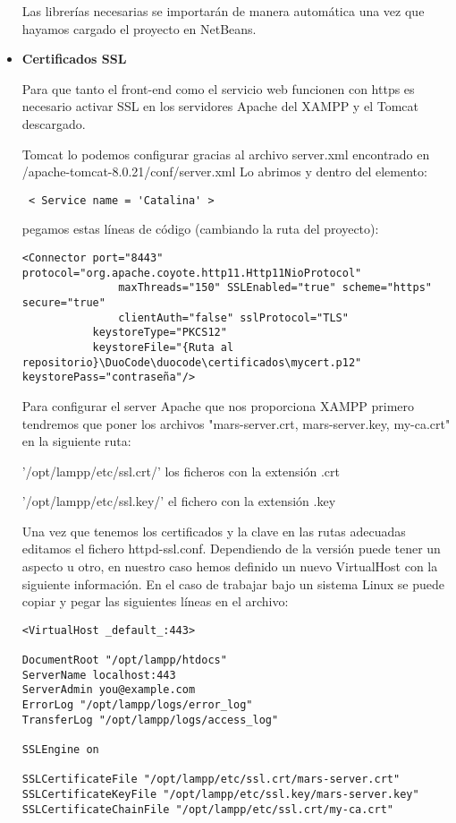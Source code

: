 \begin{itemize}
Las librerías necesarias se importarán de manera automática una vez que hayamos cargado el proyecto en NetBeans.

\item \textbf{Certificados SSL}

Para que tanto el front-end como el servicio web funcionen con https es necesario activar SSL en los servidores Apache del XAMPP y el Tomcat descargado.

Tomcat lo podemos configurar gracias al archivo server.xml encontrado en /apache-tomcat-8.0.21/conf/server.xml
Lo abrimos y dentro del elemento:
{\codesize
\begin{verbatim}
 < Service name = 'Catalina' >  
\end{verbatim}
}
pegamos estas líneas de código (cambiando la ruta del proyecto):

{\codesize
\begin{verbatim}
<Connector port="8443" protocol="org.apache.coyote.http11.Http11NioProtocol"
               maxThreads="150" SSLEnabled="true" scheme="https" secure="true"
               clientAuth="false" sslProtocol="TLS"
           keystoreType="PKCS12"
           keystoreFile="{Ruta al repositorio}\DuoCode\duocode\certificados\mycert.p12" keystorePass="contraseña"/>
\end{verbatim}
}

Para configurar el server Apache que nos proporciona XAMPP primero tendremos que poner los archivos "mars-server.crt, mars-server.key, my-ca.crt" en la siguiente ruta:

'/opt/lampp/etc/ssl.crt/' los ficheros con la extensión .crt

'/opt/lampp/etc/ssl.key/' el fichero con la extensión .key

Una vez que tenemos los certificados y la clave en las rutas adecuadas editamos el fichero httpd-ssl.conf. Dependiendo de la versión puede tener un aspecto u otro, en nuestro caso hemos definido un nuevo VirtualHost con la siguiente información. En el caso de trabajar bajo un sistema Linux se puede copiar y pegar las siguientes líneas en el archivo:

{\codesize
\begin{verbatim}
<VirtualHost _default_:443>

DocumentRoot "/opt/lampp/htdocs"
ServerName localhost:443
ServerAdmin you@example.com
ErrorLog "/opt/lampp/logs/error_log"
TransferLog "/opt/lampp/logs/access_log"

SSLEngine on

SSLCertificateFile "/opt/lampp/etc/ssl.crt/mars-server.crt"
SSLCertificateKeyFile "/opt/lampp/etc/ssl.key/mars-server.key"
SSLCertificateChainFile "/opt/lampp/etc/ssl.crt/my-ca.crt"


\end{verbatim}}
\end{itemize}
